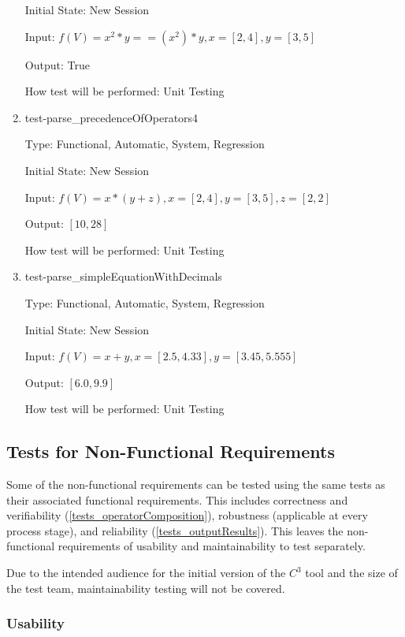 \documentclass[12pt, titlepage]{article}
\newcommand{\prognameAbbrv}{$C^{3}$}
\begin{document}
\begin{enumerate}
	Initial State: New Session
	
	Input: $f(V) = x^2 * y == (x^2) * y, x = [2,4], y = [3,5]$
	
	Output: True
	
	How test will be performed: Unit Testing\\	
	
	\item{test-parse\_precedenceOfOperators4}
	
	Type: Functional, Automatic, System, Regression
	
	Initial State: New Session
	
	Input: $f(V) = x * (y + z), x = [2,4], y = [3,5], z = [2,2]$
	
	Output: $[10, 28]$
	
	How test will be performed: Unit Testing\\
	
	\item{test-parse\_simpleEquationWithDecimals}
	
	Type: Functional, Automatic, System, Regression
	
	Initial State: New Session
	
	Input: $f(V) = x + y, x = [2.5,4.33], y = [3.45,5.555]$
	
	Output: $[6.0,9.9]$
	
	How test will be performed: Unit Testing\\
	
\end{enumerate}

\subsection{Tests for Non-Functional Requirements}
\label{testplan_nonfunctional}

Some of the non-functional requirements can be tested using the same tests as 
their associated functional requirements. This includes correctness 
and verifiability (\ref{tests_operatorComposition}), robustness (applicable at 
every process stage), and reliability (\ref{tests_outputResults}). This leaves 
the non-functional requirements of usability and maintainability to test 
separately. 

Due to the intended audience for the initial version of the \prognameAbbrv{} 
tool and the size of the test team, maintainability testing will not be covered.

\subsubsection{Usability}
\label{tests_nonfunctional_usability}
		
\end{document}
